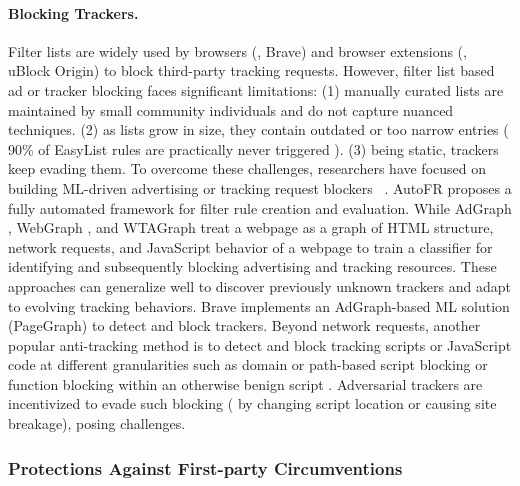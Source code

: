\paragraph{Blocking Trackers.}
Filter lists are widely used by browsers (\eg{}, Brave) and browser extensions (\eg{}, uBlock Origin) to block third-party tracking requests.
%
However, filter list based ad or tracker blocking faces significant limitations: 
%
(1) manually curated lists are maintained by small community individuals and do not capture nuanced techniques. 
%
(2) as lists grow in size, they contain outdated or too narrow entries (\eg{} 90\% of EasyList rules are practically never triggered \cite{snyderWhoFiltersFilters2020}).
%
(3) being static, trackers keep evading them.
%
To overcome these challenges, researchers have focused on building ML-driven advertising or tracking request blockers ~\cite{iqbalAdGraphGraphBasedApproach2020, sibyWebGraphCapturingAdvertising2022, yangWTAGRAPHWebTracking2022, leAutoFRAutomatedFilter2023}.
%
AutoFR \cite{leAutoFRAutomatedFilter2023} proposes a fully automated framework for filter rule creation and evaluation.
%
While AdGraph \cite{iqbalAdGraphGraphBasedApproach2020}, WebGraph \cite{sibyWebGraphCapturingAdvertising2022}, and WTAGraph \cite{yangWTAGRAPHWebTracking2022} treat a webpage as a graph of HTML structure, network requests, and JavaScript behavior of a webpage to train a classifier for identifying and subsequently blocking advertising and tracking resources.
%
These approaches can generalize well to discover previously unknown trackers and adapt to evolving tracking behaviors. 
%
Brave implements an AdGraph-based ML solution (PageGraph) to detect and block trackers.
%
Beyond network requests, another popular anti-tracking method is to detect and block tracking scripts or JavaScript code at different granularities such as domain or path-based script blocking or function blocking within an otherwise benign script \cite{ikramSeamlessTrackingFreeWeb2017,alrizahErrorsMisunderstandingsAttacks2019,snyderWhoFiltersFilters2020,smithSugarCoatProgrammaticallyGenerating2021,chenDetectingFilterList2021,daoCNAMECloakingBasedTracking2021,leCVInspectorAutomatingDetection2021,amjadTrackerSiftUntanglingMixed2021,amjadBlockingJavaScriptBreaking2023,amjadBlockingTrackingJavaScript2024}.%
Adversarial trackers are incentivized to evade such blocking (\eg{} by changing script location or causing site breakage), posing challenges.



\subsubsection{Protections Against First-party Circumventions}

